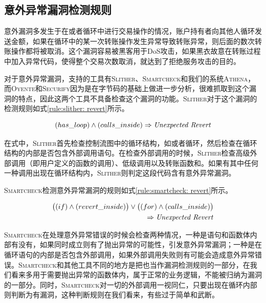 \subsection{意外异常漏洞检测规则}

意外漏洞多发生于在或者循环中进行交易操作的情况，账户持有者向其他人循环发送金额，如果在循环中的某一次转账操作发生异常导致转账异常，则后面的数次转账操作都将被取消。这个漏洞容易被黑客用于DoS攻击，如果黑衣故意在转账过程中加入异常代码，使得整个交易次数取消，就达到了拒绝服务攻击的目的。

对于意外异常漏洞，支持的工具有\textsc{Slither}、\textsc{Smartcheck}和我们的系统\textsc{Athena}，而\textsc{Oyente}和\textsc{Securify}因为是在字节码的基础上做进一步分析，很难抓取到这个漏洞的特点，因此这两个工具不具备检查这个漏洞的功能。\textsc{Slither}对于这个漏洞的检测规则如式\ref{rule:slither: revert}所示。
\begin{mdframed}[
	linewidth = 1pt,
	innertopmargin = -5pt,
	innerbottommargin = 3pt,
	outerlinewidth = 1pt
	]
    \small
	\begin{equation} \label{rule:slither: revert}
    (has\_loop) \wedge (calls\_inside) \Rightarrow \text{\emph{Unexpected Revert}}
	\end{equation}
\end{mdframed}

在式中，\textsc{Slither}首先检查控制流图中的循环结构，如或者循环，然后检查在循环结构的内部是否包含外部调用语句。在检查外部调用的时候，\textsc{Slither}检查高级外部调用（即用户定义的函数的调用）、低级调用以及转账函数和。如果有其中任何一种调用出现在循环结构内，\textsc{Slither}则判定这段代码含有意外异常漏洞。

\textsc{Smartcheck}检测意外异常漏洞的规则如式\ref{rule:smartcheck: revert}所示。
\begin{mdframed}[
	linewidth = 1pt,
	innertopmargin = -5pt,
	innerbottommargin = 3pt,
	outerlinewidth = 1pt
	]
    \small
	\begin{equation} \label{rule:smartcheck: revert}
    \begin{split}
       \big ((if) \wedge (revert\_inside)\big ) \vee \big ((for) \wedge (calls\_inside)\big ) \\
       \Rightarrow \text{\emph{Unexpected Revert}}
    \end{split}
	\end{equation}
\end{mdframed}
\textsc{Smartcheck}在处理意外异常错误的时候会检查两种情况，一种是语句和函数体内部有没有，如果同时成立则有了抛出异常的可能性，引发意外异常漏洞；一种是在循环语句的内部是否包含外部调用，如果外部调用失败则有可能会造成意外异常错误。\textsc{Smartcheck}和其他工具不同的地方是把也当作漏洞检测规则的一部分，在我们看来多用于需要抛出异常的函数体内，属于正常的业务逻辑，不能被归纳为漏洞的一部分。同时，\textsc{Smartcheck}对一切的外部调用一视同仁，只要出现在循环内部则判断为有漏洞，这种判断规则在我们看来，有些过于简单和武断。

